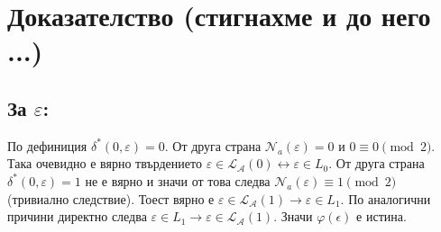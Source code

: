 \documentclass[12pt]{article}
\begin{document}
\section*{Доказателство (стигнахме и до него ...)}
\subsection*{За \(\varepsilon\):}
По дефиниция \(\delta^*(0, \varepsilon) = 0\).
От друга страна \(\mathcal{N}_a(\varepsilon) = 0\) и \(0 \equiv 0 \pmod{2}\).
Така очевидно е вярно твърдението \(\varepsilon \in \mathcal{L}_\mathcal{A}(0) \longleftrightarrow \varepsilon \in L_0\).
От друга страна \(\delta^*(0, \varepsilon) = 1\) не е вярно и значи от това следва
\(\mathcal{N}_a(\varepsilon) \equiv 1 \pmod{2}\) (тривиално следствие).
Тоест вярно е \(\varepsilon \in \mathcal{L}_\mathcal{A}(1) \longrightarrow \varepsilon \in L_1\). По аналогични причини директно следва \(\varepsilon \in L_1 \longrightarrow \varepsilon \in \mathcal{L}_\mathcal{A}(1)\). Значи \(\varphi(\epsilon)\) е истина.
\end{document}
